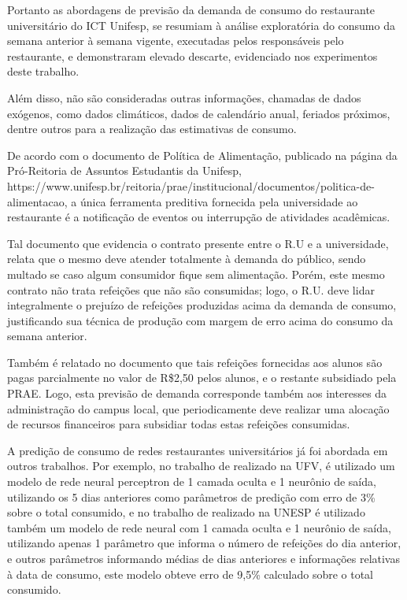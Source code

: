 Portanto as abordagens de previsão da demanda de consumo do restaurante universitário do ICT Unifesp, se resumiam à análise exploratória do consumo da semana anterior à semana vigente, executadas pelos responsáveis pelo restaurante, e demonstraram elevado descarte, evidenciado nos experimentos deste trabalho.

Além disso, não são consideradas outras informações, chamadas de dados exógenos, como dados climáticos, dados de calendário anual, feriados próximos, dentre outros para a realização das estimativas de consumo.

De acordo com o documento de Política de Alimentação, publicado na página da Pró-Reitoria de Assuntos Estudantis da Unifesp, https://www.unifesp.br/reitoria/prae/institucional/documentos/politica-de-alimentacao, a única ferramenta preditiva fornecida pela universidade ao restaurante é a notificação de eventos ou interrupção de atividades acadêmicas.

Tal documento que evidencia o contrato presente entre o R.U e a universidade, relata que o mesmo deve atender totalmente à demanda do público, sendo multado se caso algum consumidor fique sem alimentação. Porém, este mesmo contrato não trata refeições que não são consumidas; logo, o R.U. deve lidar integralmente o prejuízo de refeições produzidas acima da demanda de consumo, justificando sua técnica de produção com margem de erro acima do consumo da semana anterior.

Também é relatado no documento que tais refeições fornecidas aos alunos são pagas parcialmente no valor de R\$2,50 pelos alunos, e o restante subsidiado pela PRAE. Logo, esta previsão de demanda corresponde também aos interesses da administração do campus local, que periodicamente deve realizar uma alocação de recursos financeiros para subsidiar todas estas refeições consumidas. 

A predição de consumo de redes restaurantes universitários já foi abordada em outros trabalhos. Por exemplo, no trabalho de  \cite{Lopes2008} realizado na UFV, é utilizado um modelo de rede neural perceptron de 1 camada oculta e 1 neurônio de saída, utilizando os 5 dias anteriores como parâmetros de predição com erro de 3\% sobre o total consumido, e no trabalho de \cite{Rocha2011} realizado na UNESP é utilizado também um modelo de rede neural com 1 camada oculta e 1 neurônio de saída, utilizando apenas 1 parâmetro que informa o número de refeições do dia anterior, e outros parâmetros informando médias de dias anteriores e informações relativas à data de consumo, este modelo obteve erro de 9,5\% calculado sobre o total consumido.

